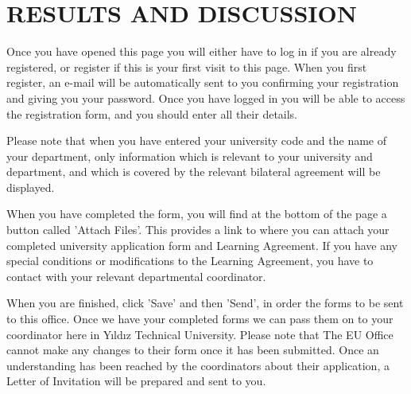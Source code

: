 \chapter{RESULTS AND DISCUSSION}

Once you have opened this page you will either have to log in if you are already registered, or register if this is your first visit to this page. When you first register, an e-mail will be automatically sent to you confirming your registration and giving you your password. Once you have logged in you will be able to access the registration form, and you should enter all their details.

Please note that when you have entered your university code and the name of your department, only information which is relevant to your university and department, and which is covered by the relevant bilateral agreement will be displayed.

When you have completed the form, you will find at the bottom of the page a button called 'Attach Files'. This provides a link to where you can attach your completed university application form and Learning Agreement. If you have any special conditions or modifications to the Learning Agreement, you have to contact with your relevant departmental coordinator.

When you are finished, click 'Save' and then 'Send', in order the forms to be sent to this office. Once we have your completed forms we can pass them on to your coordinator here in Yıldız Technical University. Please note that The EU Office cannot make any changes to their form once it has been submitted. Once an understanding has been reached by the coordinators about their application, a Letter of Invitation will be prepared and sent to you.
